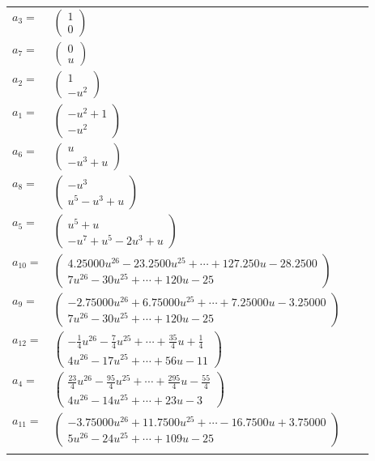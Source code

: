 \documentclass[1p]{elsarticle_modified}
\theoremstyle{definition}
\begin{document}
\begin{tabular}{m{7pt} m{180pt} m{7pt} m{180pt} }
\flushright $a_{3}=$&$\begin{pmatrix}1\\0\end{pmatrix}$ \\
\flushright $a_{7}=$&$\begin{pmatrix}0\\u\end{pmatrix}$ \\
\flushright $a_{2}=$&$\begin{pmatrix}1\\- u^2\end{pmatrix}$ \\
\flushright $a_{1}=$&$\begin{pmatrix}- u^2+1\\- u^2\end{pmatrix}$ \\
\flushright $a_{6}=$&$\begin{pmatrix}u\\- u^3+u\end{pmatrix}$ \\
\flushright $a_{8}=$&$\begin{pmatrix}- u^3\\u^5- u^3+u\end{pmatrix}$ \\
\flushright $a_{5}=$&$\begin{pmatrix}u^5+u\\- u^7+u^5-2 u^3+u\end{pmatrix}$ \\
\flushright $a_{10}=$&$\begin{pmatrix}4.25000 u^{26}-23.2500 u^{25}+\cdots+127.250 u-28.2500\\7 u^{26}-30 u^{25}+\cdots+120 u-25\end{pmatrix}$ \\
\flushright $a_{9}=$&$\begin{pmatrix}-2.75000 u^{26}+6.75000 u^{25}+\cdots+7.25000 u-3.25000\\7 u^{26}-30 u^{25}+\cdots+120 u-25\end{pmatrix}$ \\
\flushright $a_{12}=$&$\begin{pmatrix}-\frac{1}{4} u^{26}-\frac{7}{4} u^{25}+\cdots+\frac{35}{4} u+\frac{1}{4}\\4 u^{26}-17 u^{25}+\cdots+56 u-11\end{pmatrix}$ \\
\flushright $a_{4}=$&$\begin{pmatrix}\frac{23}{4} u^{26}-\frac{95}{4} u^{25}+\cdots+\frac{295}{4} u-\frac{55}{4}\\4 u^{26}-14 u^{25}+\cdots+23 u-3\end{pmatrix}$ \\
\flushright $a_{11}=$&$\begin{pmatrix}-3.75000 u^{26}+11.7500 u^{25}+\cdots-16.7500 u+3.75000\\5 u^{26}-24 u^{25}+\cdots+109 u-25\end{pmatrix}$\\&\end{tabular}
\end{document}
